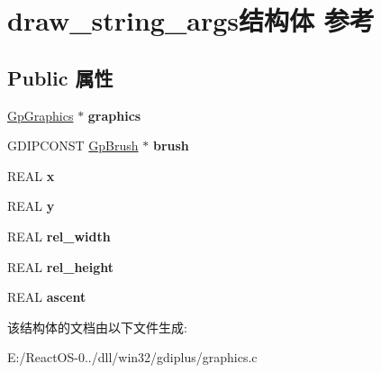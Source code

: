 \hypertarget{structdraw__string__args}{}\section{draw\+\_\+string\+\_\+args结构体 参考}
\label{structdraw__string__args}
\subsection*{Public 属性}
\begin{DoxyCompactItemize}
\item 
\mbox{\label{structdraw__string__args_a276edb3e08e9293efe7efb3562e3b5ee}} 
\hyperlink{struct_gp_graphics}{Gp\+Graphics} $\ast$ {\bfseries graphics}
\item 
\mbox{\label{structdraw__string__args_a013a5d0f4675ba0ab1367a147d1b8bc7}} 
G\+D\+I\+P\+C\+O\+N\+ST \hyperlink{struct_gp_brush}{Gp\+Brush} $\ast$ {\bfseries brush}
\item 
\mbox{\label{structdraw__string__args_a03a37206b1359feeeb6df1b45b6bf01b}} 
R\+E\+AL {\bfseries x}
\item 
\mbox{\label{structdraw__string__args_aac8797a617bc9d73f8e3c04eac265cde}} 
R\+E\+AL {\bfseries y}
\item 
\mbox{\label{structdraw__string__args_a98d1f0d23bbea013adbae0a40853f88e}} 
R\+E\+AL {\bfseries rel\+\_\+width}
\item 
\mbox{\label{structdraw__string__args_a3f852f0ea878f95fa3533540a8a7f2e6}} 
R\+E\+AL {\bfseries rel\+\_\+height}
\item 
\mbox{\label{structdraw__string__args_aa40b0620daaef66b80b79953a4953b23}} 
R\+E\+AL {\bfseries ascent}
\end{DoxyCompactItemize}


该结构体的文档由以下文件生成\+:\begin{DoxyCompactItemize}
\item 
E\+:/\+React\+O\+S-\/0../dll/win32/gdiplus/graphics.\+c\end{DoxyCompactItemize}
